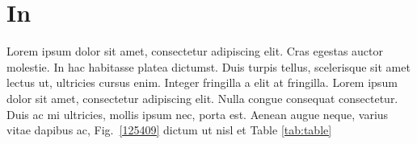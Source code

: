 \section{In}
\label{igw}

Lorem ipsum dolor sit amet, consectetur adipiscing elit. Cras egestas auctor molestie. In hac habitasse platea dictumst. Duis turpis tellus, scelerisque sit amet lectus ut, ultricies cursus enim. Integer fringilla a elit at fringilla. Lorem ipsum dolor sit amet, consectetur adipiscing elit. Nulla congue consequat consectetur. Duis ac mi ultricies, mollis ipsum nec, porta est. Aenean augue neque, varius vitae dapibus ac, Fig.~\ref{125409} dictum ut nisl et Table \ref{tab:table}
